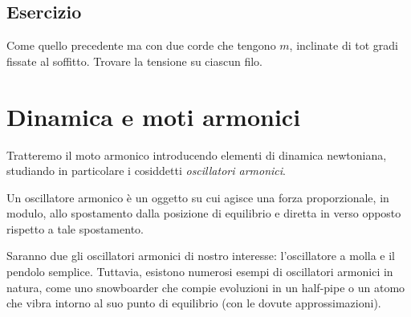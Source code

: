 \subsection*{Esercizio}
Come quello precedente ma con due corde che tengono $m$, inclinate di
tot gradi fissate al soffitto. Trovare la tensione su ciascun filo.




\section{Dinamica e moti armonici}
Tratteremo il moto armonico introducendo elementi di dinamica newtoniana,
studiando in particolare i cosiddetti \textit{oscillatori armonici}.
\vspace{8pt}
\begin{tcolorbox}[colback = yellow!30, colframe = yellow!30!black, title = {Oscillatore armonico}]
    Un oscillatore armonico è un oggetto su cui agisce una forza proporzionale,
    in modulo, allo spostamento dalla posizione di equilibrio e diretta in
    verso opposto rispetto a tale spostamento.
\end{tcolorbox}
\vspace{5pt}
Saranno due gli oscillatori armonici di nostro interesse: l'oscillatore a
molla e il pendolo semplice. Tuttavia, esistono numerosi esempi di oscillatori
armonici in natura, come uno snowboarder che compie evoluzioni in un half-pipe o
un atomo che vibra intorno al suo punto di equilibrio (con le dovute approssimazioni).



